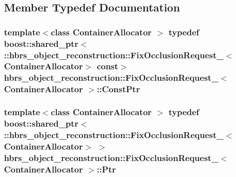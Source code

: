 \subsection{\-Member \-Typedef \-Documentation}
\hypertarget{structhbrs__object__reconstruction_1_1_fix_occlusion_request___aa0461a2e3d45a8d9e5bb0fa2bd58dcfd}{
\subsubsection[{\-Const\-Ptr}]{\setlength{\rightskip}{0pt plus 5cm}template$<$class Container\-Allocator $>$ typedef boost\-::shared\-\_\-ptr$<$ \-::{\bf hbrs\-\_\-object\-\_\-reconstruction\-::\-Fix\-Occlusion\-Request\-\_\-}$<$\-Container\-Allocator$>$ const$>$ {\bf hbrs\-\_\-object\-\_\-reconstruction\-::\-Fix\-Occlusion\-Request\-\_\-}$<$ \-Container\-Allocator $>$\-::{\bf \-Const\-Ptr}}}\label{structhbrs__object__reconstruction_1_1_fix_occlusion_request___aa0461a2e3d45a8d9e5bb0fa2bd58dcfd}
\hypertarget{structhbrs__object__reconstruction_1_1_fix_occlusion_request___ab4a27a224f264c01e0c7ffc9e517ccaa}{
\subsubsection[{\-Ptr}]{\setlength{\rightskip}{0pt plus 5cm}template$<$class Container\-Allocator $>$ typedef boost\-::shared\-\_\-ptr$<$ \-::{\bf hbrs\-\_\-object\-\_\-reconstruction\-::\-Fix\-Occlusion\-Request\-\_\-}$<$\-Container\-Allocator$>$ $>$ {\bf hbrs\-\_\-object\-\_\-reconstruction\-::\-Fix\-Occlusion\-Request\-\_\-}$<$ \-Container\-Allocator $>$\-::{\bf \-Ptr}}}\label{structhbrs__object__reconstruction_1_1_fix_occlusion_request___ab4a27a224f264c01e0c7ffc9e517ccaa}
